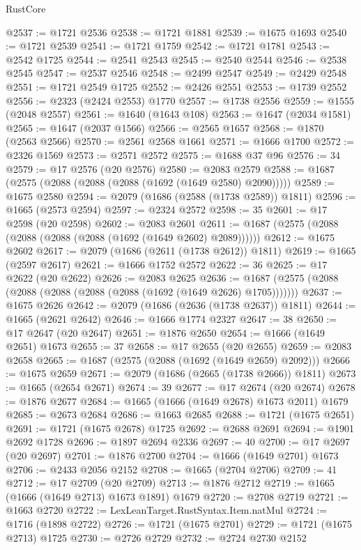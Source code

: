 \begin{lexlean}{RustCore}
\begin{coremodule}
@2537 := @1721 @2536
@2538 := @1721 @1881
@2539 := @1675 @1693
@2540 := @1721 @2539
@2541 := @1721 @1759
@2542 := @1721 @1781
@2543 := @2542 @1725
@2544 := @2541 @2543
@2545 := @2540 @2544
@2546 := @2538 @2545
@2547 := @2537 @2546
@2548 := @2499 @2547
@2549 := @2429 @2548
@2551 := @1721 @2549 @1725
@2552 := @2426 @2551
@2553 := @1739 @2552
@2556 := @2323 (@2424 @2553) @1770
@2557 := @1738 @2556
@2559 := @1555 (@2048 @2557)
@2561 := @1640 (@1643 @108)
@2563 := @1647 (@2034 @1581)
@2565 := @1647 (@2037 @1566)
@2566 := @2565 @1657
@2568 := @1870 (@2563 @2566)
@2570 := @2561 @2568 @1661
@2571 := @1666 @1700
@2572 := @2326 @1569
@2573 := @2571 @2572
@2575 := @1688 @37 @96
@2576 := 34
@2579 := @17 @2576 (@20 @2576)
@2580 := @2083 @2579
@2588 := @1687 (@2575 (@2088 (@2088 (@2088 (@1692 (@1649 @2580) @2090)))))
@2589 := @1675 @2580
@2594 := @2079 (@1686 (@2588 (@1738 @2589)) @1811)
@2596 := @1665 (@2573 @2594)
@2597 := @2324 @2572
@2598 := 35
@2601 := @17 @2598 (@20 @2598)
@2602 := @2083 @2601
@2611 := @1687 (@2575 (@2088 (@2088 (@2088 (@2088 (@1692 (@1649 @2602) @2089))))))
@2612 := @1675 @2602
@2617 := @2079 (@1686 (@2611 (@1738 @2612)) @1811)
@2619 := @1665 (@2597 @2617)
@2621 := @1666 @1752 @2572
@2622 := 36
@2625 := @17 @2622 (@20 @2622)
@2626 := @2083 @2625
@2636 := @1687 (@2575 (@2088 (@2088 (@2088 (@2088 (@2088 (@1692 (@1649 @2626) @1705)))))))
@2637 := @1675 @2626
@2642 := @2079 (@1686 (@2636 (@1738 @2637)) @1811)
@2644 := @1665 (@2621 @2642)
@2646 := @1666 @1774 @2327
@2647 := 38
@2650 := @17 @2647 (@20 @2647)
@2651 := @1876 @2650
@2654 := @1666 (@1649 @2651) @1673
@2655 := 37
@2658 := @17 @2655 (@20 @2655)
@2659 := @2083 @2658
@2665 := @1687 (@2575 (@2088 (@1692 (@1649 @2659) @2092)))
@2666 := @1675 @2659
@2671 := @2079 (@1686 (@2665 (@1738 @2666)) @1811)
@2673 := @1665 (@2654 @2671)
@2674 := 39
@2677 := @17 @2674 (@20 @2674)
@2678 := @1876 @2677
@2684 := @1665 (@1666 (@1649 @2678) @1673 @2011) @1679
@2685 := @2673 @2684
@2686 := @1663 @2685
@2688 := @1721 (@1675 @2651)
@2691 := @1721 (@1675 @2678) @1725
@2692 := @2688 @2691
@2694 := @1901 @2692 @1728
@2696 := @1897 @2694 @2336
@2697 := 40
@2700 := @17 @2697 (@20 @2697)
@2701 := @1876 @2700
@2704 := @1666 (@1649 @2701) @1673
@2706 := @2433 @2056 @2152
@2708 := @1665 (@2704 @2706)
@2709 := 41
@2712 := @17 @2709 (@20 @2709)
@2713 := @1876 @2712
@2719 := @1665 (@1666 (@1649 @2713) @1673 @1891) @1679
@2720 := @2708 @2719
@2721 := @1663 @2720
@2722 := LexLeanTarget.RustSyntax.Item.natMul
@2724 := @1716 (@1898 @2722)
@2726 := @1721 (@1675 @2701)
@2729 := @1721 (@1675 @2713) @1725
@2730 := @2726 @2729
@2732 := @2724 @2730 @2152

\end{coremodule}
\end{lexlean}
